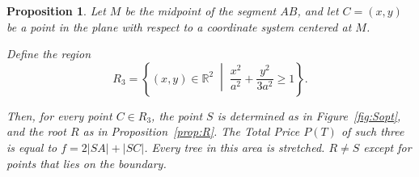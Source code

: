 \documentclass[openany]{book}
\newcommand{\Ptotal}[1]{P(#1)}
\newtheorem{proposition}{Proposition}
\begin{document}
	\begin{proposition}\label{prop:R3}
		Let \( M \) be the midpoint of the segment \( AB \), and let \( C = (x,y) \) be a point in the plane with respect to a coordinate system centered at \( M \).
		
		Define the region
		\[
		R_3 = \left\{ (x,y) \in \mathbb{R}^2 \;\middle|\; 
		\frac{x^2}{a^2} + \frac{y^2}{3a^2} \geq 1 \right\}.
		\]
		
		Then, for every point \( C \in R_3 \), the point \( S \) is determined as in Figure~\ref{fig:Sopt}, and the root \(R\) as in Proposition~\ref{prop:R}.
		The Total Price \(\Ptotal{T}\) of such three is equal to \( f = 2|SA| + |SC| \). Every tree in this area is stretched. \(R \neq S\) except for points that lies on the boundary.  
	\end{proposition}
	
\end{document}
